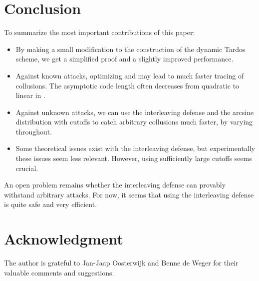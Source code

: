 \documentclass[10pt,a4paper,twocolumn]{article}
\begin{document}
\section{Conclusion}
\label{sec:conclusion}

\noindent To summarize the most important contributions of this paper:
\begin{itemize}
	\item By making a small modification to the construction of the dynamic Tardos scheme, we get a simplified proof and a slightly improved performance.
	\item Against known attacks, optimizing  and  may lead to much faster tracing of collusions. The asymptotic code length often decreases from quadratic to linear in .
	\item Against unknown attacks, we can use the interleaving defense and the arcsine distribution with cutoffs to catch arbitrary collusions much faster, by varying  throughout. 
	\item Some theoretical issues exist with the interleaving defense, but experimentally these issues seem less relevant. However, using sufficiently large cutoffs seems crucial.
\end{itemize}
An open problem remains whether the interleaving defense can provably withstand arbitrary attacks. For now, it seems that using the interleaving defense is quite safe and very efficient.





\section*{Acknowledgment}

The author is grateful to Jan-Jaap Oosterwijk and Benne de Weger for their valuable comments and suggestions.







\end{document}

